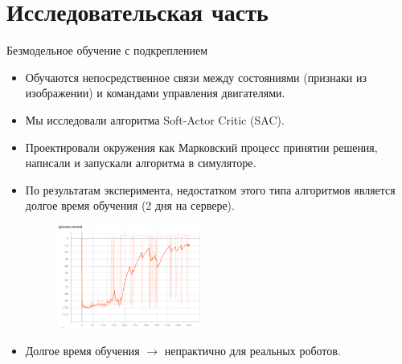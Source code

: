 \documentclass{beamer}
\begin{document}
\section{Исследовательская часть}
\begin{frame}{Безмодельное обучение с подкреплением}
    \begin{itemize}
        \item <1> Обучаются непосредственное связи между состояниями (признаки из изображении) и командами управления двигателями.
        \item <2> Мы исследовали алгоритма Soft-Actor Critic (SAC).
        \item <3> Проектировали окружения как Марковский процесс принятии решения, написали и запускали алгоритма в симуляторе.
        \item <4> По результатам эксперимента, недостатком этого типа алгоритмов является долгое время обучения (2 дня на сервере).
         {
        \begin{figure}
            \centering
            \includegraphics[width=0.45\textwidth]{img/rew.png}
        \end{figure}
        }
        \item <5> Долгое время обучения $\rightarrow$ непрактично для реальных роботов.
    \end{itemize}
\end{frame}
\end{document}
